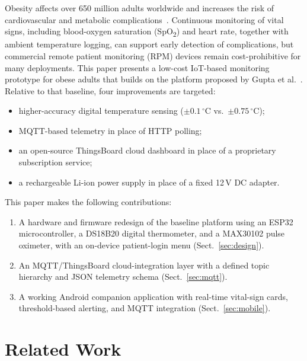 \documentclass[pdflatex,sn-mathphys-num]{sn-jnl}
\begin{document}
Obesity affects over 650 million adults worldwide and increases the
risk of cardiovascular and metabolic complications~\cite{who2023}.
Continuous monitoring of vital signs, including blood-oxygen
saturation (SpO\textsubscript{2}) and heart rate, together with
ambient temperature logging, can support early detection of
complications, but commercial remote patient monitoring (RPM)
devices remain cost-prohibitive for many deployments. This paper
presents a low-cost IoT-based monitoring prototype for obese adults
that builds on the platform proposed by Gupta et
al.~\cite{gupta2020}. Relative to that baseline, four improvements are
targeted:

\begin{itemize}
  \item higher-accuracy digital temperature sensing
    ($\pm0.1\,^\circ$C vs.\ $\pm0.75\,^\circ$C);
  \item MQTT-based telemetry in place of HTTP polling;
  \item an open-source ThingsBoard cloud dashboard in place of a
    proprietary subscription service;
  \item a rechargeable Li-ion power supply in place of a fixed
    12\,V DC adapter.
\end{itemize}

This paper makes the following contributions:
\begin{enumerate}
  \item A hardware and firmware redesign of the baseline platform
    using an ESP32 microcontroller, a DS18B20 digital thermometer,
    and a MAX30102 pulse oximeter, with an on-device
    patient-login menu (Sect.~\ref{sec:design}).
  \item An MQTT/ThingsBoard cloud-integration layer with a defined
    topic hierarchy and JSON telemetry schema
    (Sect.~\ref{sec:mqtt}).
  \item A working Android companion application with real-time
    vital-sign cards, threshold-based alerting, and MQTT integration
    (Sect.~\ref{sec:mobile}).
\end{enumerate}

\section{Related Work}\label{sec:related}
\end{document}
